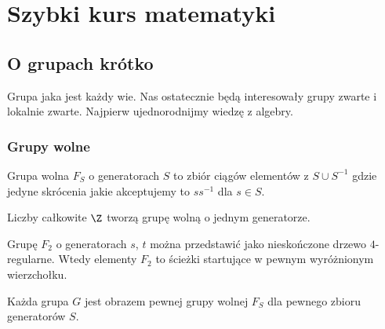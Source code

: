 \chapter{Szybki kurs matematyki}  

\section{O grupach krótko}

Grupa jaka jest każdy wie. Nas ostatecznie będą interesowały grupy zwarte i lokalnie zwarte. Najpierw ujednorodnijmy wiedzę z algebry.

\subsection{Grupy wolne}

Grupa wolna $F_S$ o generatorach $S$ to zbiór ciągów elementów z $S\cup S^{-1}$ gdzie jedyne skrócenia jakie akceptujemy to $ss^{-1}$ dla $s\in S$.

\begin{example}[m]
  \item Liczby całkowite $\Z$ tworzą grupę wolną o jednym generatorze.
  \item Grupę $F_2$ o generatorach $s$, $t$ można przedstawić jako nieskończone drzewo $4$-regularne. Wtedy elementy $F_2$ to ścieżki startujące w pewnym wyróżnionym wierzchołku.
    \begin{center}
    \end{center}
\end{example}

\begin{lemma}{}{}
  Każda grupa $G$ jest obrazem pewnej grupy wolnej $F_S$ dla pewnego zbioru generatorów $S$.
\end{lemma}

